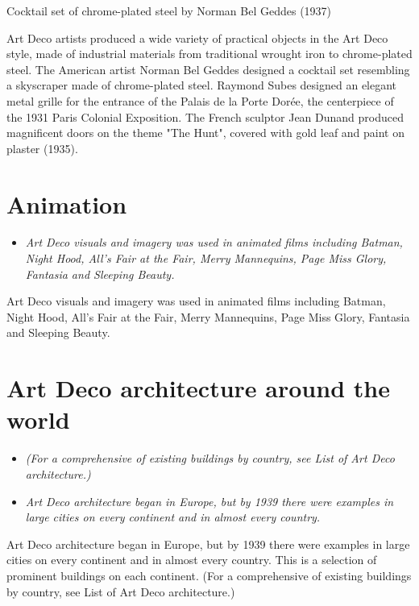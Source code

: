 Cocktail set of chrome-plated steel by Norman Bel Geddes (1937)

Art Deco artists produced a wide variety of practical objects in the Art
Deco style, made of industrial materials from traditional wrought iron
to chrome-plated steel. The American artist Norman Bel Geddes designed a
cocktail set resembling a skyscraper made of chrome-plated steel.
Raymond Subes designed an elegant metal grille for the entrance of the
Palais de la Porte Dorée, the centerpiece of the 1931 Paris Colonial
Exposition. The French sculptor Jean Dunand produced magnificent doors
on the theme "The Hunt", covered with gold leaf and paint on plaster
(1935).

\section{Animation}\label{animation}

\begin{itemize}
\item
  \emph{Art Deco visuals and imagery was used in animated films
  including Batman, Night Hood, All's Fair at the Fair, Merry
  Mannequins, Page Miss Glory, Fantasia and Sleeping Beauty.}
\end{itemize}

Art Deco visuals and imagery was used in animated films including
Batman, Night Hood, All's Fair at the Fair, Merry Mannequins, Page Miss
Glory, Fantasia and Sleeping Beauty.

\section{Art Deco architecture around the
world}\label{art-deco-architecture-around-the-world}

\begin{itemize}
\item
  \emph{(For a comprehensive of existing buildings by country, see List
  of Art Deco architecture.)}
\item
  \emph{Art Deco architecture began in Europe, but by 1939 there were
  examples in large cities on every continent and in almost every
  country.}
\end{itemize}

Art Deco architecture began in Europe, but by 1939 there were examples
in large cities on every continent and in almost every country. This is
a selection of prominent buildings on each continent. (For a
comprehensive of existing buildings by country, see List of Art Deco
architecture.)

